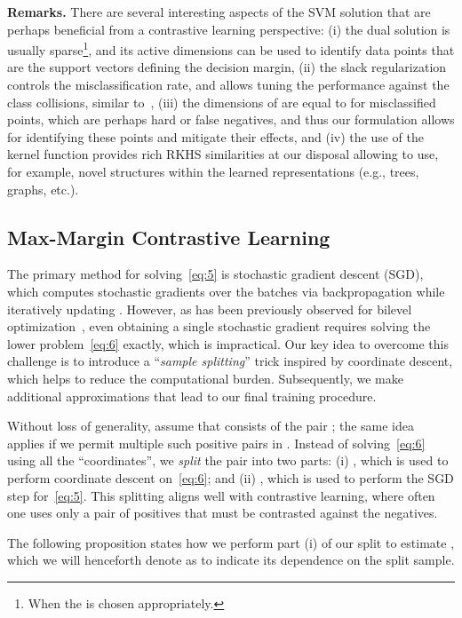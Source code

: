 \documentclass[letterpaper]{article} \usepackage{aaai22}  \usepackage{times}  \usepackage{helvet}  \usepackage{courier}  \usepackage[hyphens]{url}  \usepackage{graphicx} \urlstyle{rm} \def\UrlFont{\rm}  \usepackage{natbib}  \usepackage{caption} \DeclareCaptionStyle{ruled}{labelfont=normalfont,labelsep=colon,strut=off} \frenchspacing  \setlength{\pdfpagewidth}{8.5in}  \setlength{\pdfpageheight}{11in}
\begin{document}
\textbf{Remarks.} There are several interesting aspects of the SVM solution that are perhaps beneficial from a contrastive learning perspective: (i) the dual solution  is usually sparse\footnote{When the  is chosen appropriately.}, and its active dimensions can be used to identify data points that are the support vectors defining the decision margin, (ii) the slack regularization controls the misclassification rate, and allows tuning the performance against the class collisions, similar to~\cite{chuang2020debiased}, (iii) the dimensions of  are equal to  for misclassified points, which are perhaps hard or false negatives, and thus our formulation allows for identifying these points and mitigate their effects, and (iv) the use of the kernel function provides rich RKHS similarities at our disposal allowing to use, for example, novel structures within the learned representations (e.g., trees, graphs, etc.). 

\subsection{Max-Margin Contrastive Learning}
\label{sec:mmcl}
The primary method for solving~\eqref{eq:5} is stochastic gradient descent (SGD), which computes stochastic gradients over the batches  via backpropagation while iteratively updating . However, as has been previously observed for bilevel optimization~\citep{amos2017optnet,gould2016differentiating}, even obtaining a single stochastic gradient requires solving the lower problem~\eqref{eq:6} exactly, which is impractical. Our key idea to overcome this challenge is to introduce a ``\emph{sample splitting}'' trick inspired by coordinate descent, which helps to reduce the computational burden. Subsequently, we make additional approximations that lead to our final training procedure.

Without loss of generality, assume that  consists of the pair ; the same idea applies if we permit multiple such positive pairs in . Instead of solving~\eqref{eq:6} using all the ``coordinates'', we \emph{split} the pair  into two parts: (i) , which is used to perform coordinate descent on~\eqref{eq:6}; and (ii) , which is used to perform the SGD step for~\eqref{eq:5}. This splitting aligns well with contrastive learning, where often one uses only a pair of positives that must be contrasted against the negatives. 

The following proposition states how we perform part (i) of our split to estimate , which we will henceforth denote as  to indicate its dependence on the split sample. 
\end{document}
